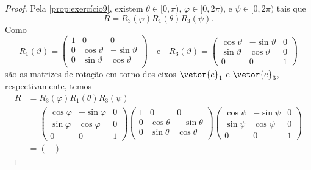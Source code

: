 \begin{proof}
    Pela \cref{prop:exercício9}, existem \(\theta \in [0,\pi)\), \(\varphi \in [0,2\pi)\), e \(\psi \in [0,2\pi)\) tais que
    \begin{equation*}
        R = R_3(\varphi)R_1(\theta)R_3(\psi).
    \end{equation*}
    Como
    \begin{equation*}
        R_1(\vartheta) = \begin{pmatrix}
            1 & 0 & 0\\
            0 & \cos\vartheta & -\sin\vartheta\\
            0 & \sin\vartheta & \cos\vartheta\\
        \end{pmatrix}
        \quad\text{e}\quad
        R_3(\vartheta) = \begin{pmatrix}
            \cos\vartheta & -\sin\vartheta & 0\\
            \sin\vartheta & \cos\vartheta & 0\\
            0 & 0 & 1
        \end{pmatrix}
    \end{equation*}
    são as matrizes de rotação em torno dos eixos \(\vetor{e}_1\) e \(\vetor{e}_3\), respectivamente, temos
    \begin{align*}
        R &=
        R_3(\varphi)
        R_1(\theta)
        R_3(\psi)\\
          &=
        \begin{pmatrix}
            \cos\varphi & -\sin\varphi & 0\\
            \sin\varphi & \cos\varphi & 0\\
            0 & 0 & 1
        \end{pmatrix}
        \begin{pmatrix}
            1 & 0 & 0\\
            0 & \cos\theta & -\sin\theta\\
            0 & \sin\theta & \cos\theta\\
        \end{pmatrix}
        \begin{pmatrix}
            \cos\psi & -\sin\psi & 0\\
            \sin\psi & \cos\psi & 0\\
            0 & 0 & 1
        \end{pmatrix}\\
                  &=
        \begin{pmatrix}

\end{pmatrix}
\end{align*}
\end{proof}
